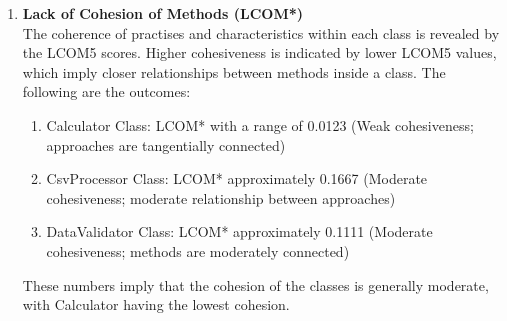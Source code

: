 \begin{enumerate}
\item \textbf{Lack of Cohesion of Methods (LCOM*)}\\
The coherence of practises and characteristics within each class is revealed by the LCOM5 scores. Higher cohesiveness is indicated by lower LCOM5 values, which imply closer relationships between methods inside a class. The following are the outcomes: 
 \begin{enumerate}
     \item Calculator Class: LCOM* with a range of 0.0123 (Weak cohesiveness; approaches are tangentially connected) 
     \item CsvProcessor Class: LCOM* approximately 0.1667 (Moderate cohesiveness; moderate relationship between approaches) 
     \item DataValidator Class: LCOM* approximately 0.1111 (Moderate cohesiveness; methods are moderately connected)
 \end{enumerate}
 
 These numbers imply that the cohesion of the classes is generally moderate, with Calculator having the lowest cohesion.  
 
\end{enumerate}
\pagebreak